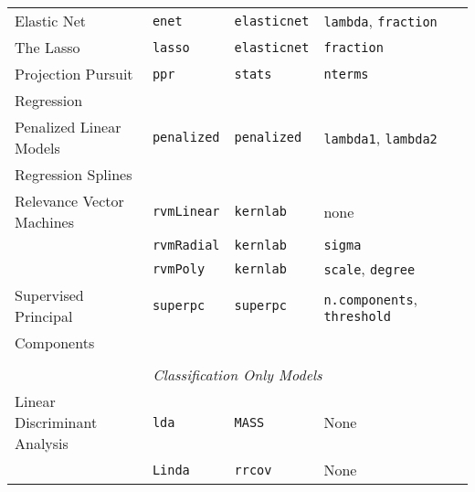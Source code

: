 \documentclass[12pt]{article}
\begin{document}
\begin{longtable}{lllll}
      Elastic Net &
         \texttt{enet} & 
            \texttt{elasticnet}      & 
            \texttt{lambda}, \texttt{fraction} \\          

      The Lasso &
         \texttt{lasso} & 
            \texttt{elasticnet}      & 
            \texttt{fraction} \\       

      Projection Pursuit   &
         \texttt{ppr} & 
            \texttt{stats}       & 
            \texttt{nterms} \\            
      \:\: Regression & & &\\                   
            
      Penalized Linear Models  &
         \texttt{penalized} & 
            \texttt{penalized}       & 
            \texttt{lambda1}, \texttt{lambda2} \\            
      \:\: Regression Splines & & &\\
      
      Relevance Vector Machines  &
         \texttt{rvmLinear} & 
            \texttt{kernlab}       & 
            none \\            
      
  &
         \texttt{rvmRadial} & 
            \texttt{kernlab}       & 
            \texttt{sigma} \\              
      
  &
         \texttt{rvmPoly} & 
            \texttt{kernlab}       & 
            \texttt{scale}, \texttt{degree} \\                        
            
      Supervised Principal &
         \texttt{superpc}  &
         \texttt{superpc}  &
         \texttt{n.components}, 
         \texttt{threshold} \\
      \:\: Components  & & &\\
      \\       
             
\multicolumn{5}{c}{{{\em Classification Only Models}}} \\ 
      Linear Discriminant Analysis &
         \texttt{lda} & 
            \texttt{MASS}       &          
            None\\
            
          &
         \texttt{Linda} & 
            \texttt{rrcov}       &          
            None\\
                        

\end{longtable}
\end{document}
